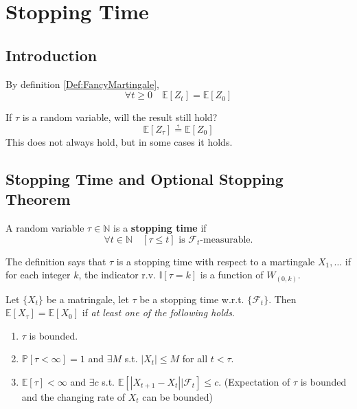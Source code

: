 \section{Stopping Time}
    \subsection{Introduction}
        By definition \ref{Def:FancyMartingale},
        \[ \forall t \ge 0 \quad \mathbb{E}[Z_t] = \mathbb{E}[Z_0] \]

        If $\tau$ is a random variable, will the result still hold?
        \[\mathbb{E}[Z_{\tau}] \questeq \mathbb{E}[Z_0]\]
        This does not always hold, but in some cases it holds.

    \subsection{Stopping Time and Optional Stopping Theorem}
        \begin{definition}\label{Def:StoppingTime}
            A random variable $\tau \in \mathbb{N}$ is a \textbf{stopping time} if
            \[ \forall t \in \mathbb{N} \quad [\tau \le t] \text{ is $\mathcal{F}_t$-measurable.} \]
        \end{definition}
        \begin{remark}
            The definition says that $\tau$ is a stopping time with respect to a martingale $X_1,\dots$ if for each integer $k$, the indicator r.v. $\mathbb{I}[\tau = k]$ is a function of $W_{(0,k)}$.
        \end{remark}

        \begin{theorem}\label{Thm:OptionalStoppingTheorem}
            Let $\{X_t\}$ be a matringale, let $\tau$ be a stopping time w.r.t. $\{\mathcal{F}_t\}$. Then $\mathbb{E}[X_{\tau}] = \mathbb{E}[X_0]$ if \emph{at least one of the following holds}.
            \begin{enumerate}
                \item $\tau$ is bounded.
                \item $\mathbb{P}[\tau < \infty] = 1$ and $\exists M$ s.t. $|X_t| \le M$ for all $t < \tau$.
                \item $\mathbb{E}[\tau] < \infty$ and $\exists c$ s.t. $\mathbb{E}[|X_{t+1} - X_{t}||\mathcal{F}_t] \le c$. (Expectation of $\tau$ is bounded and the changing rate of $X_t$ can be bounded)
            \end{enumerate}
        \end{theorem}


